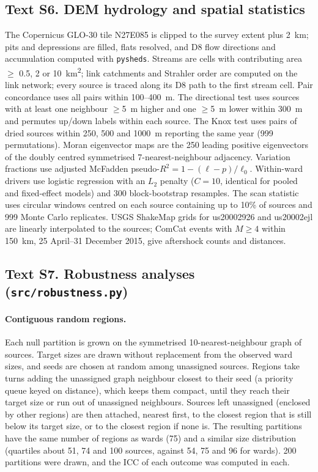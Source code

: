 \subsection*{Text S6. DEM hydrology and spatial statistics}
The Copernicus GLO-30 tile N27E085 is clipped to the survey extent plus \SI{2}{\kilo\metre}; pits and depressions are filled, flats resolved, and D8 flow directions and accumulation computed with \texttt{pysheds}. Streams are cells with contributing area $\geq$ 0.5, 2 or \SI{10}{\kilo\metre\squared}; link catchments and Strahler order are computed on the link network; every source is traced along its D8 path to the first stream cell. Pair concordance uses all pairs within 100--\SI{400}{\metre}. The directional test uses sources with at least one neighbour $\geq$\SI{5}{\metre} higher and one $\geq$\SI{5}{\metre} lower within \SI{300}{\metre} and permutes up/down labels within each source. The Knox test uses pairs of dried sources within 250, 500 and \SI{1000}{\metre} reporting the same year (999 permutations). Moran eigenvector maps are the 250 leading positive eigenvectors of the doubly centred symmetrised 7-nearest-neighbour adjacency. Variation fractions use adjusted McFadden pseudo-$R^2 = 1-(\ell-p)/\ell_0$. Within-ward drivers use logistic regression with an $L_2$ penalty ($C=10$, identical for pooled and fixed-effect models) and 300 block-bootstrap resamples. The scan statistic uses circular windows centred on each source containing up to 10\% of sources and 999 Monte Carlo replicates. USGS ShakeMap grids for us20002926 and us20002ejl are linearly interpolated to the sources; ComCat events with $M\geq4$ within \SI{150}{\kilo\metre}, 25 April--31 December 2015, give aftershock counts and distances.

\subsection*{Text S7. Robustness analyses (\texttt{src/robustness.py})}
\paragraph{Contiguous random regions.} Each null partition is grown on the symmetrised 10-nearest-neighbour graph of sources. Target sizes are drawn without replacement from the observed ward sizes, and seeds are chosen at random among unassigned sources. Regions take turns adding the unassigned graph neighbour closest to their seed (a priority queue keyed on distance), which keeps them compact, until they reach their target size or run out of unassigned neighbours. Sources left unassigned (enclosed by other regions) are then attached, nearest first, to the closest region that is still below its target size, or to the closest region if none is. The resulting partitions have the same number of regions as wards (75) and a similar size distribution (quartiles about 51, 74 and 100 sources, against 54, 75 and 96 for wards). 200 partitions were drawn, and the ICC of each outcome was computed in each.

